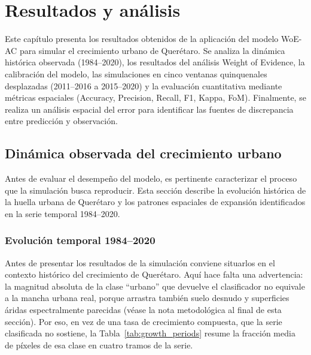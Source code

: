 \graphicspath{{figures/}{../figures/}}

\chapter{Resultados y análisis}
\label{ch:resultados-analisis}

\begin{resumen}
Este capítulo presenta los resultados obtenidos de la aplicación del modelo WoE-AC para simular el crecimiento urbano de Querétaro. Se analiza la dinámica histórica observada (1984--2020), los resultados del análisis Weight of Evidence, la calibración del modelo, las simulaciones en cinco ventanas quinquenales desplazadas (2011--2016 a 2015--2020) y la evaluación cuantitativa mediante métricas espaciales (Accuracy, Precision, Recall, F1, Kappa, FoM). Finalmente, se realiza un análisis espacial del error para identificar las fuentes de discrepancia entre predicción y observación.
\end{resumen}

\section{Dinámica observada del crecimiento urbano}

Antes de evaluar el desempeño del modelo, es pertinente caracterizar el proceso que la simulación busca reproducir. Esta sección describe la evolución histórica de la huella urbana de Querétaro y los patrones espaciales de expansión identificados en la serie temporal 1984--2020.

\subsection{Evolución temporal 1984--2020}

Antes de presentar los resultados de la simulación conviene situarlos en el contexto histórico del crecimiento de Querétaro. Aquí hace falta una advertencia: la magnitud absoluta de la clase ``urbano'' que devuelve el clasificador no equivale a la mancha urbana real, porque arrastra también suelo desnudo y superficies áridas espectralmente parecidas (véase la nota metodológica al final de esta sección). Por eso, en vez de una tasa de crecimiento compuesta, que la serie clasificada no sostiene, la Tabla~\ref{tab:growth_periods} resume la fracción media de píxeles de esa clase en cuatro tramos de la serie.

